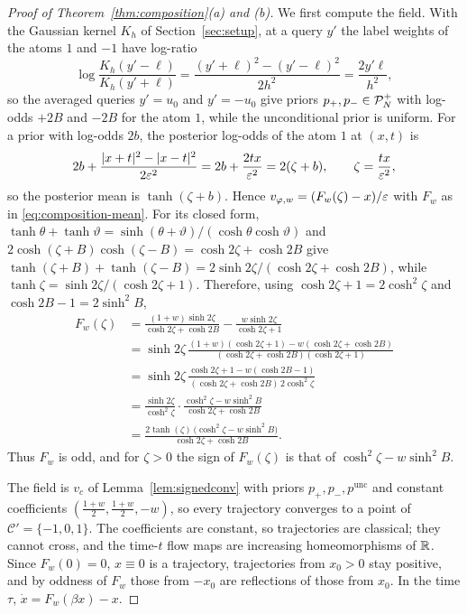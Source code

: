 \documentclass{article} %
\newcommand{\iclrbr}{\\&}\newcommand{\iclrbrq}{\\&\qquad}\newcommand{\iclrqbr}{\\&}
\newcommand{\iclrbr}{}\newcommand{\iclrbrq}{}\newcommand{\iclrqbr}{\qquad}
\theoremstyle{plain}
\theoremstyle{definition}
\theoremstyle{remark}
\begin{document}
\begin{proof}[Proof of Theorem~\ref{thm:composition}(a) and (b)]
We first compute the field. With the Gaussian kernel $K_h$ of Section~\ref{sec:setup}, at a query
$y'$ the label weights of the atoms $1$ and $-1$ have log-ratio
\[
\log\frac{K_h(y'-\ell)}{K_h(y'+\ell)}=\frac{(y'+\ell)^2-(y'-\ell)^2}{2h^2}=\frac{2y'\ell}{h^2},
\]
so the averaged queries $y'=u_0$ and $y'=-u_0$ give priors $p_+,p_-\in\mathcal{P}_N^{+}$ with log-odds $+2B$ and
$-2B$ for the atom $1$, while the unconditional prior is uniform. For a prior with log-odds $2b$,
the posterior log-odds of the atom $1$ at $(x,t)$ is
\[
2b+\frac{|x+t|^2-|x-t|^2}{2\varepsilon^2}=2b+\frac{2tx}{\varepsilon^2}=2(\zeta+b),\qquad \zeta=\frac{tx}{\varepsilon^2},
\]
so the posterior mean is $\tanh(\zeta+b)$. Hence $v_{\varphi,w}=(F_w(\zeta)-x)/\varepsilon$ with $F_w$ as in
\eqref{eq:composition-mean}. For its closed form, $\tanh\theta+\tanh\vartheta=
\sinh(\theta+\vartheta)/(\cosh\theta\cosh\vartheta)$ and
$2\cosh(\zeta+B)\cosh(\zeta-B)=\cosh2\zeta+\cosh2B$ give
$\tanh(\zeta+B)+\tanh(\zeta-B)=2\sinh2\zeta/(\cosh2\zeta+\cosh2B)$, while $\tanh \zeta=\sinh2\zeta/(\cosh2\zeta+1)$. Therefore,
using $\cosh2\zeta+1=2\cosh^2\zeta$ and $\cosh2B-1=2\sinh^2B$,
\begin{align*}
F_w(\zeta)
&=\frac{(1+w)\sinh2\zeta}{\cosh2\zeta+\cosh2B}-\frac{w\sinh2\zeta}{\cosh2\zeta+1}
\iclrbr=\sinh2\zeta\,\frac{(1+w)(\cosh2\zeta+1)-w(\cosh2\zeta+\cosh2B)}{(\cosh2\zeta+\cosh2B)(\cosh2\zeta+1)}\\
&=\sinh2\zeta\,\frac{\cosh2\zeta+1-w(\cosh2B-1)}{(\cosh2\zeta+\cosh2B)\,2\cosh^2\zeta}
\iclrbr=\frac{\sinh2\zeta}{\cosh^2\zeta}\cdot\frac{\cosh^2\zeta-w\sinh^2B}{\cosh2\zeta+\cosh2B}\\
&=\frac{2\tanh(\zeta)\,\bigl(\cosh^2\zeta-w\sinh^2B\bigr)}{\cosh2\zeta+\cosh2B}.
\end{align*}
Thus $F_w$ is odd, and for $\zeta>0$ the sign of $F_w(\zeta)$ is that of $\cosh^2\zeta-w\sinh^2B$.

The field is $v_c$ of Lemma~\ref{lem:signedconv} with priors $p_+,p_-,p^{\mathrm{unc}}$ and constant
coefficients $(\tfrac{1+w}2,\tfrac{1+w}2,-w)$, so every trajectory converges to a point of
$\mathcal C'=\{-1,0,1\}$. The coefficients are constant, so trajectories are classical; they cannot
cross, and the time-$t$ flow maps are increasing homeomorphisms of $\mathbb{R}$. Since $F_w(0)=0$,
$x\equiv0$ is a trajectory, trajectories from $x_0>0$ stay positive, and by oddness of $F_w$ those
from $-x_0$ are reflections of those from $x_0$. In the time $\tau$, $\dot x=F_w(\beta x)-x$.


\end{proof}
\end{document}
